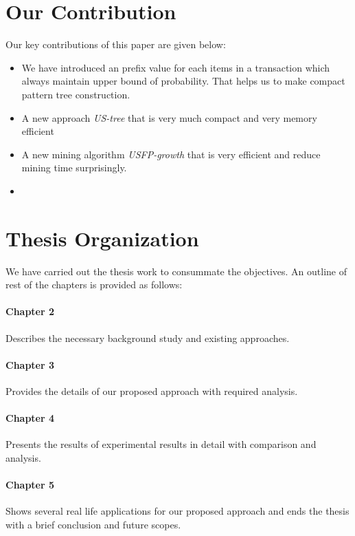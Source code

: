 \section{Our Contribution}
Our key contributions of this paper are given below:
\begin{itemize}
\item We have introduced an prefix value for each items in a transaction which always maintain upper bound of probability. That helps us to make compact pattern tree construction.
\item A new approach \emph{US-tree} that is very much compact and very memory efficient
\item A new mining algorithm \emph{USFP-growth} that is very efficient and reduce mining time surprisingly.
\item 
\end{itemize}


\section{Thesis Organization}
We have carried out the thesis work to consummate the objectives. An outline of rest of the chapters is provided as follows:
\paragraph{Chapter 2}
Describes the necessary background study and existing approaches.
\paragraph{Chapter 3}
Provides the details of our proposed approach with required analysis.
\paragraph{Chapter 4}
Presents the results of experimental results in detail with comparison and analysis.
\paragraph{Chapter 5}
Shows several real life applications for our proposed approach and ends the thesis with a brief conclusion and future scopes.
%